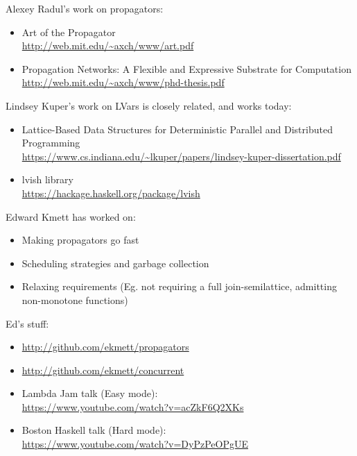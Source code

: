 \documentclass[usenames,dvipsnames,svgnames,table,aspectratio=1610,mathserif]{beamer}
\newcommand{\textslideleft}[1]{{
\begin{frame}

#1

\end{frame}
}}
\begin{document}
\begin{frame}

Alexey Radul's work on propagators:

\begin{itemize}
\item Art of the Propagator \\
      \url{http://web.mit.edu/~axch/www/art.pdf}
\item Propagation Networks: A Flexible and Expressive Substrate for Computation \\
      \url{http://web.mit.edu/~axch/www/phd-thesis.pdf}
\end{itemize}
\end{frame}


\textslideleft{

Lindsey Kuper's work on LVars is closely related, and works today:

\begin{itemize}
\item Lattice-Based Data Structures for Deterministic Parallel and Distributed Programming \\
      \url{https://www.cs.indiana.edu/~lkuper/papers/lindsey-kuper-dissertation.pdf}
\item lvish library \\
      \url{https://hackage.haskell.org/package/lvish}
\end{itemize}

}

\textslideleft{
Edward Kmett has worked on:

\begin{itemize}
\item Making propagators go fast
\item Scheduling strategies and garbage collection
\item Relaxing requirements (Eg. not requiring a full join-semilattice, admitting non-monotone functions)
\end{itemize}

Ed's stuff:
\begin{itemize}
\item \url{http://github.com/ekmett/propagators}
\item \url{http://github.com/ekmett/concurrent}
\item Lambda Jam talk (Easy mode): \\
      \url{https://www.youtube.com/watch?v=acZkF6Q2XKs}
\item Boston Haskell talk (Hard mode): \\
      \url{https://www.youtube.com/watch?v=DyPzPeOPgUE}

\end{itemize}
}
\end{document}
